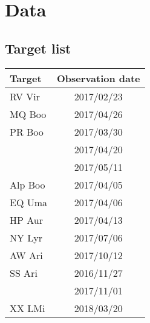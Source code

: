 \chapter{Data}

\section{Target list}
\begin{center}
\begin{tabular}{l c}
    \toprule
    Target  &   Observation date \\ \bottomrule
    RV Vir  & 2017/02/23 \\ \midrule
    MQ Boo  & 2017/04/26 \\ \midrule
    PR Boo  & 2017/03/30 \\ \midrule
            & 2017/04/20 \\ \midrule
            & 2017/05/11 \\ \midrule
    Alp Boo & 2017/04/05 \\ \midrule
    EQ Uma  & 2017/04/06 \\ \midrule
    HP Aur  & 2017/04/13 \\ \midrule
    NY Lyr  & 2017/07/06 \\ \midrule
    AW Ari  & 2017/10/12 \\ \midrule
    SS Ari  & 2016/11/27 \\ \midrule
            & 2017/11/01 \\ \midrule
    XX LMi  & 2018/03/20 \\
    \bottomrule
\end{tabular}
\end{center}
